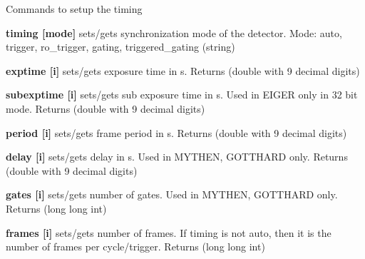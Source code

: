 Commands to setup the timing


\begin{DoxyItemize}
\item {\bfseries timing \mbox{[}mode\mbox{]}} sets/gets synchronization mode of the detector. Mode: auto, trigger, ro\_\-trigger, gating, triggered\_\-gating (string)
\end{DoxyItemize}


\begin{DoxyItemize}
\item {\bfseries exptime \mbox{[}i\mbox{]}} sets/gets exposure time in s. {\ttfamily Returns} {\ttfamily }(double with 9 decimal digits)
\end{DoxyItemize}


\begin{DoxyItemize}
\item {\bfseries subexptime \mbox{[}i\mbox{]}} sets/gets sub exposure time in s. Used in EIGER only in 32 bit mode. {\ttfamily Returns} {\ttfamily }(double with 9 decimal digits)
\end{DoxyItemize}


\begin{DoxyItemize}
\item {\bfseries period \mbox{[}i\mbox{]}} sets/gets frame period in s. {\ttfamily Returns} {\ttfamily }(double with 9 decimal digits)
\end{DoxyItemize}


\begin{DoxyItemize}
\item {\bfseries delay \mbox{[}i\mbox{]}} sets/gets delay in s. Used in MYTHEN, GOTTHARD only. {\ttfamily Returns} {\ttfamily }(double with 9 decimal digits)
\end{DoxyItemize}


\begin{DoxyItemize}
\item {\bfseries gates \mbox{[}i\mbox{]}} sets/gets number of gates. Used in MYTHEN, GOTTHARD only. {\ttfamily Returns} {\ttfamily }(long long int)
\end{DoxyItemize}


\begin{DoxyItemize}
\item {\bfseries frames \mbox{[}i\mbox{]}} sets/gets number of frames. If {\ttfamily timing} is not {\ttfamily auto}, then it is the number of frames per cycle/trigger. {\ttfamily Returns} {\ttfamily }(long long int)
\end{DoxyItemize}


